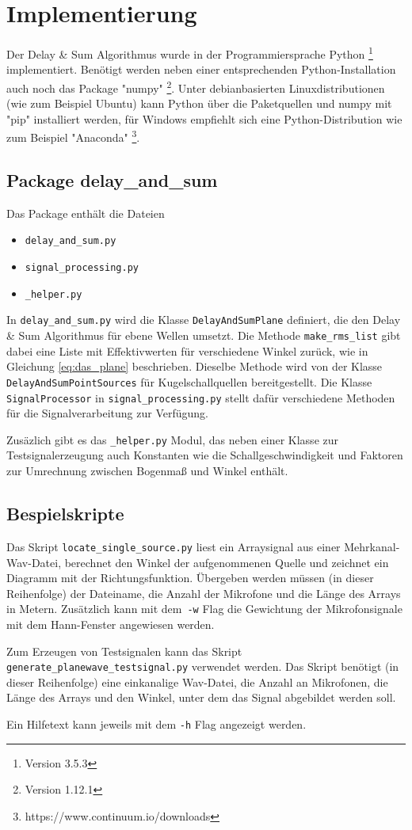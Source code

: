 \section{Implementierung}
	
	Der Delay \& Sum Algorithmus wurde in der Programmiersprache Python \footnote{Version 3.5.3} implementiert. Benötigt werden neben einer entsprechenden Python-Installation auch noch das Package "numpy" \footnote{Version 1.12.1}. Unter debianbasierten Linuxdistributionen (wie zum Beispiel Ubuntu) kann Python über die Paketquellen und numpy mit "pip" installiert werden, für Windows empfiehlt sich eine Python-Distribution wie zum Beispiel "Anaconda" \footnote{https://www.continuum.io/downloads}.
	
	\subsection{Package delay\_and\_sum}
	
	Das Package enthält die Dateien
	\begin{itemize}
		\item \texttt{delay\_and\_sum.py}
		\item \texttt{signal\_processing.py}
		\item \texttt{\_helper.py}
	\end{itemize}
	In \texttt{delay\_and\_sum.py} wird die Klasse \texttt{DelayAndSumPlane} definiert, die den Delay \& Sum Algorithmus für ebene Wellen umsetzt. Die Methode \texttt{make\_rms\_list} gibt dabei eine Liste mit Effektivwerten für verschiedene Winkel zurück, wie in Gleichung \ref{eq:das_plane} beschrieben. Dieselbe Methode wird von der Klasse \texttt{DelayAndSumPointSources} für Kugelschallquellen bereitgestellt.
	Die Klasse \texttt{SignalProcessor} in \texttt{signal\_processing.py} stellt dafür verschiedene Methoden für die Signalverarbeitung zur Verfügung.
	
	Zusäzlich gibt es das \texttt{\_helper.py} Modul, das neben einer Klasse zur Testsignalerzeugung auch Konstanten wie die Schallgeschwindigkeit und Faktoren zur Umrechnung zwischen Bogenmaß und Winkel enthält.
	
\subsection{Bespielskripte}

	Das Skript \texttt{locate\_single\_source.py} liest ein Arraysignal aus einer Mehrkanal-Wav-Datei, berechnet den Winkel der aufgenommenen Quelle und zeichnet ein Diagramm mit der Richtungsfunktion.
	Übergeben werden müssen (in dieser Reihenfolge) der Dateiname, die Anzahl der Mikrofone und die Länge des Arrays in Metern. Zusätzlich kann mit dem~\texttt{-w} Flag die Gewichtung der Mikrofonsignale mit dem Hann-Fenster angewiesen werden.
	
	Zum Erzeugen von Testsignalen kann das Skript \texttt{generate\_planewave\_testsignal.py} verwendet werden. Das Skript benötigt (in dieser Reihenfolge) eine einkanalige Wav-Datei, die Anzahl an Mikrofonen, die Länge des Arrays und den Winkel, unter dem das Signal abgebildet werden soll.
	
	Ein Hilfetext kann jeweils mit dem \texttt{-h} Flag angezeigt werden.